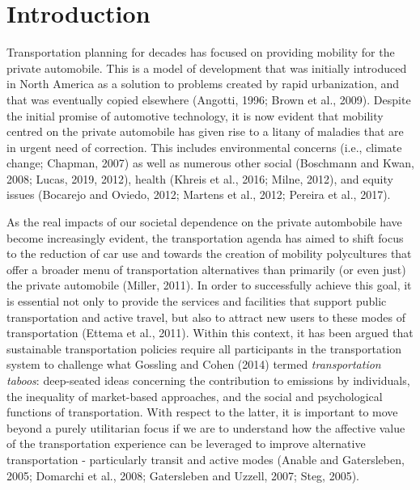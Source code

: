 \documentclass[]{elsarticle} %
\begin{document}
\hypertarget{introduction}{%
\section{Introduction}\label{introduction}}

Transportation planning for decades has focused on providing mobility
for the private automobile. This is a model of development that was
initially introduced in North America as a solution to problems created
by rapid urbanization, and that was eventually copied elsewhere
(Angotti, 1996; Brown et al., 2009). Despite the initial promise of
automotive technology, it is now evident that mobility centred on the
private automobile has given rise to a litany of maladies that are in
urgent need of correction. This includes environmental concerns (i.e.,
climate change; Chapman, 2007) as well as numerous other social
(Boschmann and Kwan, 2008; Lucas, 2019, 2012), health (Khreis et al.,
2016; Milne, 2012), and equity issues (Bocarejo and Oviedo, 2012;
Martens et al., 2012; Pereira et al., 2017).

As the real impacts of our societal dependence on the private
autombobile have become increasingly evident, the transportation agenda
has aimed to shift focus to the reduction of car use and towards the
creation of mobility polycultures that offer a broader menu of
transportation alternatives than primarily (or even just) the private
automobile (Miller, 2011). In order to successfully achieve this goal,
it is essential not only to provide the services and facilities that
support public transportation and active travel, but also to attract new
users to these modes of transportation (Ettema et al., 2011). Within
this context, it has been argued that sustainable transportation
policies require all participants in the transportation system to
challenge what Gossling and Cohen (2014) termed \emph{transportation
taboos}: deep-seated ideas concerning the contribution to emissions by
individuals, the inequality of market-based approaches, and the social
and psychological functions of transportation. With respect to the
latter, it is important to move beyond a purely utilitarian focus if we
are to understand how the affective value of the transportation
experience can be leveraged to improve alternative transportation -
particularly transit and active modes (Anable and Gatersleben, 2005;
Domarchi et al., 2008; Gatersleben and Uzzell, 2007; Steg, 2005).
\end{document}
